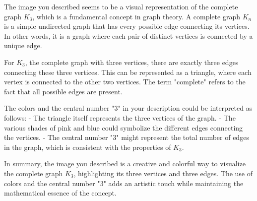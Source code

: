 The image you described seems to be a visual representation of the complete graph \(K_3\), which is a fundamental concept in graph theory. A complete graph \(K_n\) is a simple undirected graph that has every possible edge connecting its vertices. In other words, it is a graph where each pair of distinct vertices is connected by a unique edge.

For \(K_3\), the complete graph with three vertices, there are exactly three edges connecting these three vertices. This can be represented as a triangle, where each vertex is connected to the other two vertices. The term "complete" refers to the fact that all possible edges are present.

The colors and the central number "3" in your description could be interpreted as follows:
- The triangle itself represents the three vertices of the graph.
- The various shades of pink and blue could symbolize the different edges connecting the vertices.
- The central number "3" might represent the total number of edges in the graph, which is consistent with the properties of \(K_3\).

In summary, the image you described is a creative and colorful way to visualize the complete graph \(K_3\), highlighting its three vertices and three edges. The use of colors and the central number "3" adds an artistic touch while maintaining the mathematical essence of the concept.